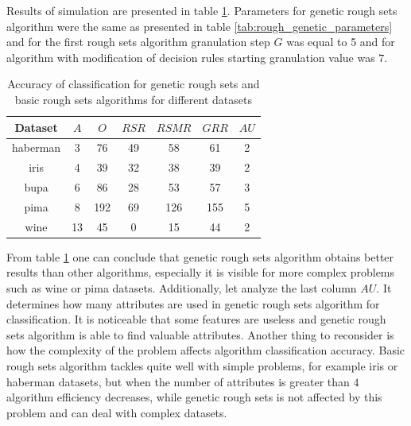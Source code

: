 Results of simulation are presented in table \ref{tab:genetic_rough_results}.
Parameters for genetic rough sets algorithm were the same as presented in table
\ref{tab:rough_genetic_parameters} and for the first rough sets algorithm
granulation step $G$ was equal to 5 and for algorithm with modification of
decision rules starting granulation value was $7$.
\begin{table}[H]
    \centering
    \begin{tabular}{|c|c|c|c|c|c|c|}
        \hline
        Dataset & $A$ & $O$ & $RSR$ & $RSMR$ & $GRR$ & $AU$\\ 
        \hline \hline
        haberman& 3&	76&	49&	58&	61 & 2 \\ \hline
        iris&	4&	39&	32&	38&	39 & 2\\ \hline
        bupa&  	6&	86&	28&	53&	57 & 3\\ \hline 
        pima&   8&	192&	69&	126& 155 & 5 \\ \hline
        wine& 13&	45&	0&	15&	44 & 2\\ \hline
    \end{tabular}
    \caption{Accuracy of classification for genetic rough sets and basic rough
    sets algorithms for different datasets}
    \label{tab:genetic_rough_results}
\end{table}
From table \ref{tab:genetic_rough_results} one can conclude that genetic rough
sets algorithm obtains better results than other algorithms, especially it is
visible for more complex problems such as wine or pima datasets. Additionally,
let analyze the last column $AU$. It determines how many attributes are used in
genetic rough sets algorithm for classification. It is noticeable that some
features are useless and genetic rough sets algorithm is able to find
valuable attributes. Another thing to reconsider is how the complexity of the
problem affects algorithm classification accuracy. Basic rough sets algorithm
tackles quite well with simple problems, for example iris or haberman datasets,
but when the number of attributes is greater than $4$ algorithm efficiency
decreases, while genetic rough sets is not affected by this problem and can
deal with complex datasets.


